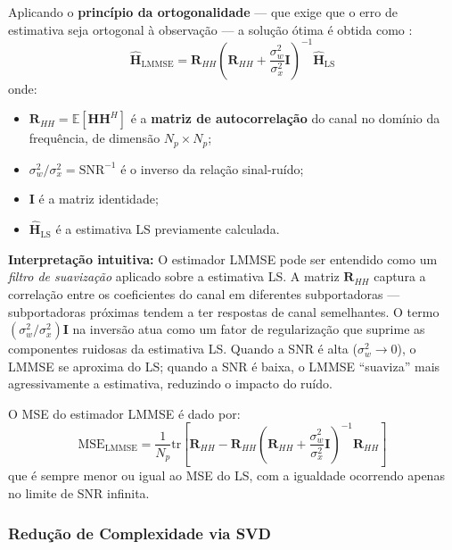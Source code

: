 \documentclass[conference]{IEEEtran}
\begin{document}
Aplicando o \textbf{princípio da ortogonalidade} --- que exige que o erro de estimativa seja ortogonal à observação --- a solução ótima é obtida como \cite{vanDeBeek1995}:
\begin{equation}
    \hat{\mathbf{H}}_{\text{LMMSE}} = \mathbf{R}_{HH} \left(\mathbf{R}_{HH} + \frac{\sigma_w^2}{\sigma_x^2} \mathbf{I}\right)^{-1} \hat{\mathbf{H}}_{\text{LS}}
    \label{eq:lmmse}
\end{equation}
onde:
\begin{itemize}
    \item $\mathbf{R}_{HH} = \mathbb{E}[\mathbf{H}\mathbf{H}^H]$ é a \textbf{matriz de autocorrelação} do canal no domínio da frequência, de dimensão $N_p \times N_p$;
    \item $\sigma_w^2 / \sigma_x^2 = \text{SNR}^{-1}$ é o inverso da relação sinal-ruído;
    \item $\mathbf{I}$ é a matriz identidade;
    \item $\hat{\mathbf{H}}_{\text{LS}}$ é a estimativa LS previamente calculada.
\end{itemize}

\textbf{Interpretação intuitiva:} O estimador LMMSE pode ser entendido como um \textit{filtro de suavização} aplicado sobre a estimativa LS. A matriz $\mathbf{R}_{HH}$ captura a correlação entre os coeficientes do canal em diferentes subportadoras --- subportadoras próximas tendem a ter respostas de canal semelhantes. O termo $(\sigma_w^2/\sigma_x^2)\mathbf{I}$ na inversão atua como um fator de regularização que suprime as componentes ruidosas da estimativa LS. Quando a SNR é alta ($\sigma_w^2 \to 0$), o LMMSE se aproxima do LS; quando a SNR é baixa, o LMMSE ``suaviza'' mais agressivamente a estimativa, reduzindo o impacto do ruído.

O MSE do estimador LMMSE é dado por:
\begin{equation}
    \text{MSE}_{\text{LMMSE}} = \frac{1}{N_p} \text{tr}\!\left[\mathbf{R}_{HH} - \mathbf{R}_{HH}\left(\mathbf{R}_{HH} + \frac{\sigma_w^2}{\sigma_x^2}\mathbf{I}\right)^{-1}\mathbf{R}_{HH}\right]
    \label{eq:mse_lmmse}
\end{equation}
que é sempre menor ou igual ao MSE do LS, com a igualdade ocorrendo apenas no limite de SNR infinita.

\subsubsection{Redução de Complexidade via SVD}
\end{document}
